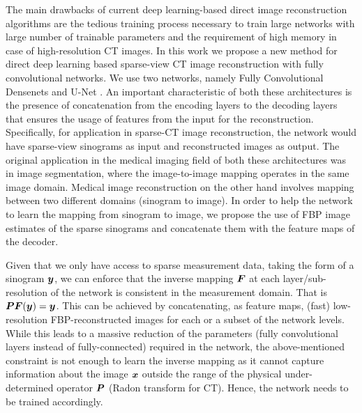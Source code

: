 The main drawbacks of current deep learning-based direct image reconstruction algorithms are the tedious training process necessary to train large networks with large number of trainable parameters and the requirement of high memory in case of high-resolution \ac{CT} images. 
In this work we propose a new method for direct deep learning based sparse-view \ac{CT} image reconstruction with fully convolutional networks. We use two networks, namely Fully Convolutional Densenets \cite{jegou2017one} and U-Net \cite{ronneberger2015u}. An important characteristic of both these architectures \cite{jegou2017one,ronneberger2015u} is the presence of concatenation from the encoding layers to the decoding layers that ensures the usage of features from the input for the reconstruction. Specifically, for application in sparse-\ac{CT} image reconstruction, the network would have sparse-view sinograms as input and reconstructed images as output. The original application in the medical imaging field of both these architectures was in image segmentation, where the image-to-image mapping operates in the same image domain. Medical image reconstruction on the other hand involves mapping between two different domains (sinogram to image). In order to help the network to learn the mapping from sinogram to image, we propose the use of \ac{FBP} image estimates of the sparse sinograms and concatenate them with the feature maps of the decoder. 


Given that we only have access to sparse measurement data, taking the form of a sinogram $\bm{y}$, we can enforce that the inverse mapping $\bm{F}$ at each layer/sub-resolution of the network is consistent in the measurement domain. That is $\bm{P} \bm{F}(\bm{y}) = \bm{y}$. This can be achieved by concatenating, as feature maps, (fast) low-resolution \ac{FBP}-reconstructed images for each or a subset of the network levels. While this leads to a massive reduction of the parameters (fully convolutional layers instead of fully-connected) required in the network, the above-mentioned constraint is not enough to learn the inverse mapping as it cannot capture information about the image $\bm{x}$ outside the range of the physical under-determined operator $\bm{P}$ (Radon transform for CT). Hence, the network needs to be trained accordingly.

